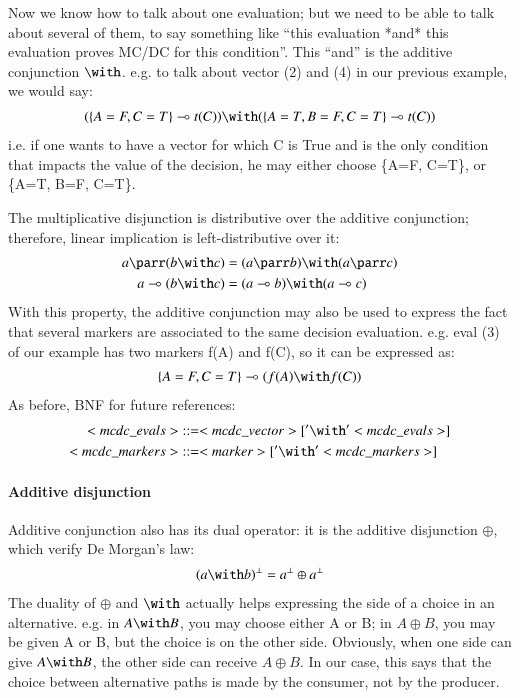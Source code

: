 \documentclass[a4paper,12pt,twoside]{article}
\begin{document}
Now we know how to talk about one evaluation; but we need to be able
to talk about several of them, to say something like ``this evaluation *and*
this evaluation proves MC/DC for this condition''. This ``and'' is the
additive conjunction $\with$. e.g. to talk about vector (2) and (4) in our
previous example, we would say:
\begin{align*}
  (\{A=F, C=T\} \multimap t(C)) \with (\{A=T, B=F, C=T\} \multimap t(C))
\end{align*}
i.e. if one wants to have a vector for which C is True and is the only
condition that impacts the value of the decision, he may either choose
\{A=F, C=T\}, or \{A=T, B=F, C=T\}.

The multiplicative disjunction is distributive over the additive
conjunction; therefore, linear implication is left-distributive over
it:
\begin{align*}
 a \parr (b \with c)     & = (a \parr b) \with (a \parr c)\\
 a \multimap (b \with c) & = (a \multimap b) \with (a \multimap c)
\end{align*}
With this property, the additive conjunction may also be used to
express the fact that several markers are associated to the same
decision evaluation.  e.g. eval (3) of our example has two markers f(A)
and f(C), so it can be expressed as:
\begin{align*}
  \{A=F, C=T\} \multimap (f(A) \with f(C))
\end{align*}
As before, BNF for future references:
\begin{align*}
 <mcdc\_evals>   & ::= <mcdc\_vector> [ '\with' <mcdc\_evals> ]\\
 <mcdc\_markers> & ::= <marker> [ '\with' <mcdc\_markers> ]
\end{align*}

\paragraph{Additive disjunction}

Additive conjunction also has its dual operator: it is the additive
disjunction $\oplus$, which verify De Morgan's law:
\begin{align*}
 (a \with b)^\bot = a^\bot \oplus a^\bot
\end{align*}
The duality of $\oplus$ and $\with$ actually helps expressing the side
of a choice in an alternative. e.g. in $A \with B$, you may choose
either A or B; in $A \oplus B$, you may be given A or B, but the
choice is on the other side. Obviously, when one side can give $A
\with B$, the other side can receive $A \oplus B$. In our case, this
says that the choice between alternative paths is made by the
consumer, not by the producer.
\end{document}
